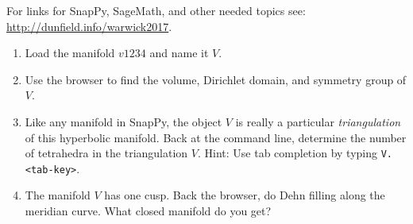 \documentclass[tikz, a4paper]{nmd/hw}
\begin{document}

For links for SnapPy, SageMath, and other needed topics see: \url{http://dunfield.info/warwick2017}.


\begin{problems}

  \item 
    \begin{enumerate}
      \item Load the manifold $v1234$ and name it $V$.  
      \item Use the browser to find the volume, Dirichlet domain, and
        symmetry group of $V$.
      \item Like any manifold in SnapPy, the object $V$ is really a
        particular \emph{triangulation} of this hyperbolic manifold.
        Back at the command line, determine the number of tetrahedra
        in the triangulation $V$.  Hint: Use tab completion by
        typing \texttt{V.<tab-key>}.  
      \item The manifold $V$ has one cusp.  Back the browser, do Dehn
        filling along the meridian curve.  What closed manifold do you get?  
    \end{enumerate}
 

\end{problems}
\end{document}
